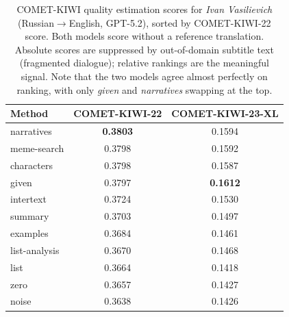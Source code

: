 \begin{table}[h]
\centering
\begin{tabular}{lcc}
\toprule
\textbf{Method} & \textbf{COMET-KIWI-22} & \textbf{COMET-KIWI-23-XL} \\
\midrule
narratives    & \textbf{0.3803} & 0.1594 \\
meme-search   & 0.3798          & 0.1592 \\
characters    & 0.3798          & 0.1587 \\
given         & 0.3797          & \textbf{0.1612} \\
intertext     & 0.3724          & 0.1530 \\
summary       & 0.3703          & 0.1497 \\
examples      & 0.3684          & 0.1461 \\
list-analysis & 0.3670          & 0.1468 \\
list          & 0.3664          & 0.1418 \\
zero          & 0.3657          & 0.1427 \\
noise         & 0.3638          & 0.1426 \\
\bottomrule
\end{tabular}
\caption{COMET-KIWI quality estimation scores for \textit{Ivan Vasilievich} (Russian$\to$English, GPT-5.2), sorted by COMET-KIWI-22 score. Both models score without a reference translation. Absolute scores are suppressed by out-of-domain subtitle text (fragmented dialogue); relative rankings are the meaningful signal. Note that the two models agree almost perfectly on ranking, with only \textit{given} and \textit{narratives} swapping at the top.}
\label{tab:comet-ivan-vas}
\end{table}
